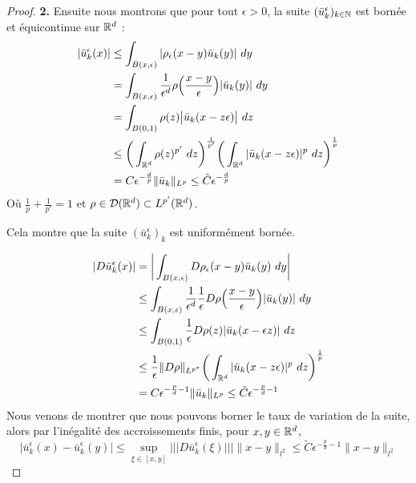 \begin{proof}
    \vspace{1em}

    \textbf{2.}
    Ensuite nous montrons que pour tout $\epsilon > 0$, la suite $(\bar{u}_k^{\epsilon})_{k \in \mathbb{N}}$ est bornée et équicontinue sur $\mathbb{R}^d$ :
    \begin{equation*}
    \begin{split}
        |\bar{u}_k^{\epsilon}(x)| &\leq \int_{B(x,\epsilon)} |\rho_{\epsilon}(x - y)\bar{u}_k(y)| \ dy \\
        &= \int_{B(x,\epsilon)} \frac{1}{\epsilon^d} \rho\Big(\frac{x - y}{\epsilon}\Big) | \bar{u}_k(y)| \ dy \\
        &= \int_{B(0,1)} \rho(z) \big|\bar{u}_k(x - z\epsilon)\big| \ dz \\
        &\leq \bigg(\int_{\R^d} \rho(z)^{p'} \ dz\bigg)^{\frac{1}{p'}}\bigg( \int_{\R^d} |\bar{u}_k(x - z\epsilon)|^p \ dz \bigg)^{\frac{1}{p}} \\
        &= C \epsilon^{-\frac{d}{p}} \| \bar{u}_k \|_{L^p} \leq \tilde{C} \epsilon^{-\frac{d}{p}}
    \end{split}
    \end{equation*}
    Où $\frac{1}{p} + \frac{1}{p'} = 1$ et $\rho \in \mathcal{D}(\mathbb{R}^d) \subset L^{p'}(\mathbb{R}^d)$.

    Cela montre que la suite $(\bar{u}_k^{\epsilon})_k$ est uniformément bornée.

    \begin{equation*}
    \begin{split}
        |D\bar{u}_k^{\epsilon}(x)| &= \bigg| \int_{B(x,\epsilon)} D\rho_{\epsilon}(x - y)\bar{u}_k(y) \ dy \bigg| \\
        &\leq \int_{B(x,\epsilon)} \frac{1}{\epsilon^d} \frac{1}{\epsilon} D \rho\Big( \frac{x - y}{\epsilon} \Big) |\bar{u}_k(y)| \ dy \\
        &\leq \int_{B(0,1)}\frac{1}{\epsilon} D \rho(z) |\bar{u}_k(x - \epsilon z)| \ dz \\
        &\leq \frac{1}{\epsilon} \|D\rho\|_{L^{p^*}} \bigg( \int_{\mathbb{R}^d} |\bar{u}_k(x - z\epsilon)|^p \ dz \bigg)^{\frac{1}{p}} \\
        &= C \epsilon^{-\frac{p}{d} - 1} \| \bar{u}_k \|_{L^p} \leq \tilde{C} \epsilon^{-\frac{p}{d} - 1}
    \end{split}
    \end{equation*}
    Nous venons de montrer que nous pouvons borner le taux de variation de la suite, alors par l'inégalité des accroissements finis, pour $x,y \in \mathbb{R}^d$,
    $$|\bar{u}_k^{\epsilon}(x) - \bar{u}_k^{\epsilon}(y)| \leq \underset{\xi \in [x,y]}{\sup}\lvert\!\lvert\!\lvert D\bar{u}_k^{\epsilon}(\xi) \rvert\!\rvert\!\rvert \|x - y\|_{l^2} \leq \tilde{C}\epsilon^{-\frac{p}{d} - 1} \|x - y\|_{l^2} $$


\end{proof}
